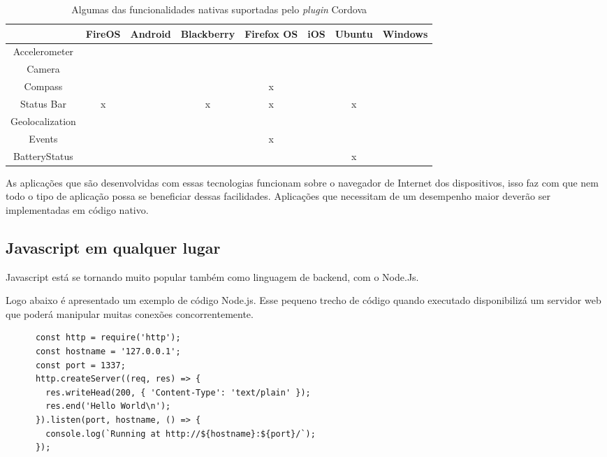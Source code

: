 \begin{table}[!htb]
	\footnotesize
	\centering
	\caption[Funcionalidades nativas suportadas pelo \textit{plugin} Cordova]{Algumas das funcionalidades nativas suportadas pelo \textit{plugin} Cordova}
	\begin{tabular}{*8{c|}}
		 & \textbf{FireOS} & \textbf{Android} & \textbf{Blackberry} & \textbf{Firefox OS} & \textbf{iOS} & \textbf{Ubuntu} & \textbf{Windows}\\ \hline
		Accelerometer & \checkmark & \checkmark & \checkmark & \checkmark & \checkmark & \checkmark & \checkmark\\ \hline \SPACE
		Camera & \checkmark & \checkmark & \checkmark & \checkmark & \checkmark & \checkmark & \checkmark\\ \hline \SPACE
		Compass & \checkmark & \checkmark & \checkmark & x & \checkmark & \checkmark & \checkmark\\ \hline \SPACE
		Status Bar & x & \checkmark & x & x & \checkmark & x & \checkmark\\ \hline \SPACE
		Geolocalization & \checkmark & \checkmark & \checkmark & \checkmark & \checkmark & \checkmark & \checkmark\\ \hline \SPACE
		Events & \checkmark & \checkmark & \checkmark & x & \checkmark & \checkmark & \checkmark\\ \hline \SPACE
		BatteryStatus & \checkmark & \checkmark & \checkmark & \checkmark & \checkmark & x & \checkmark\\
		\hline
	\end{tabular}
	\label{tab:cordova}
\end{table}
\vspace{-3mm}

As aplicações que são desenvolvidas com essas tecnologias funcionam sobre o navegador de Internet dos dispositivos, isso faz com que nem todo o tipo de aplicação possa se beneficiar dessas facilidades. Aplicações que necessitam de um desempenho maior deverão ser implementadas em código nativo.

\subsection{Javascript em qualquer lugar}
Javascript está se tornando muito popular também como linguagem de backend, com o Node.Js.

Logo abaixo é apresentado um exemplo de código Node.js. Esse pequeno trecho de código quando executado disponibilizá um servidor web que poderá manipular muitas conexões concorrentemente.
\begin{footnotesize}
	\begin{verbatim}
	  const http = require('http');
	  const hostname = '127.0.0.1';
	  const port = 1337;
	  http.createServer((req, res) => {
	    res.writeHead(200, { 'Content-Type': 'text/plain' });
	    res.end('Hello World\n');
	  }).listen(port, hostname, () => {
	    console.log(`Running at http://${hostname}:${port}/`);
	  });
	\end{verbatim}
\end{footnotesize}

